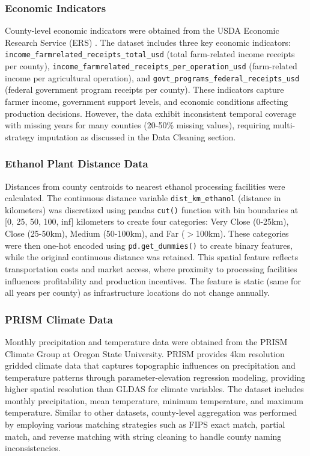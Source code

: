 \documentclass[twocolumn]{article}
\begin{document}
\subsubsection{Economic Indicators}
County-level economic indicators were obtained from the USDA Economic Research Service (ERS) \cite{usda_ers}. The dataset includes three key economic indicators: \texttt{income\_farmrelated\_receipts\_total\_usd} (total farm-related income receipts per county), \texttt{income\_farmrelated\_receipts\_per\_operation\_usd} (farm-related income per agricultural operation), and \texttt{govt\_programs\_federal\_receipts\_usd} (federal government program receipts per county). These indicators capture farmer income, government support levels, and economic conditions affecting production decisions. However, the data exhibit inconsistent temporal coverage with missing years for many counties (20-50\% missing values), requiring multi-strategy imputation as discussed in the Data Cleaning section.

\subsubsection{Ethanol Plant Distance Data}
Distances from county centroids to nearest ethanol processing facilities were calculated. The continuous distance variable \texttt{dist\_km\_ethanol} (distance in kilometers) was discretized using pandas \texttt{cut()} function with bin boundaries at [0, 25, 50, 100, inf] kilometers to create four categories: Very Close (0-25km), Close (25-50km), Medium (50-100km), and Far ($>$100km). These categories were then one-hot encoded using \texttt{pd.get\_dummies()} to create binary features, while the original continuous distance was retained. This spatial feature reflects transportation costs and market access, where proximity to processing facilities influences profitability and production incentives. The feature is static (same for all years per county) as infrastructure locations do not change annually.

\subsubsection{PRISM Climate Data}
Monthly precipitation and temperature data were obtained from the PRISM Climate Group at Oregon State University. PRISM provides 4km resolution gridded climate data that captures topographic influences on precipitation and temperature patterns through parameter-elevation regression modeling, providing higher spatial resolution than GLDAS for climate variables. The dataset includes monthly precipitation, mean temperature, minimum temperature, and maximum temperature. Similar to other datasets, county-level aggregation was performed by employing various matching strategies such as FIPS exact match, partial match, and reverse matching with string cleaning to handle county naming inconsistencies.
\end{document}
